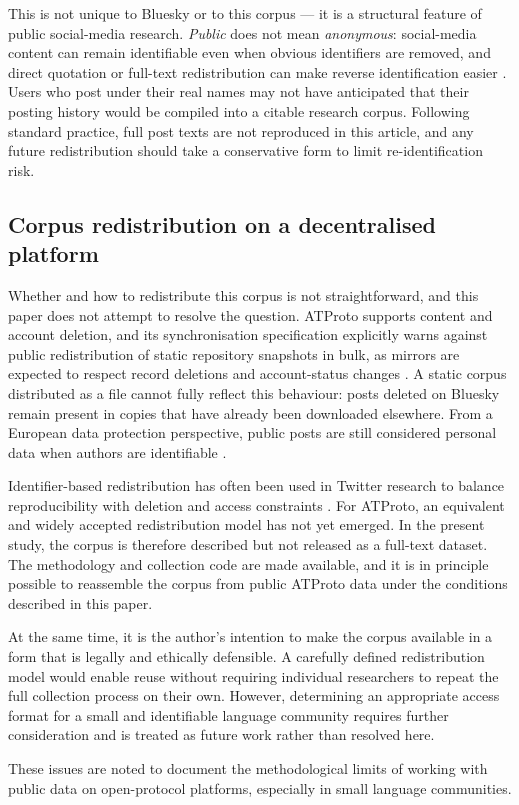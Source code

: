 This is not unique to Bluesky or to this corpus --- it is a structural feature of public social-media research. \textit{Public} does not mean \textit{anonymous}: social-media content can remain identifiable even when obvious identifiers are removed, and direct quotation or full-text redistribution can make reverse identification easier \parencite{aoir2019internet,ayers2018dont}. Users who post under their real names may not have anticipated that their posting history would be compiled into a citable research corpus. Following standard practice, full post texts are not reproduced in this article, and any future redistribution should take a conservative form to limit re-identification risk.

\subsection{Corpus redistribution on a decentralised platform}

Whether and how to redistribute this corpus is not straightforward, and this paper does not attempt to resolve the question. ATProto supports content and account deletion, and its synchronisation specification explicitly warns against public redistribution of static repository snapshots in bulk, as mirrors are expected to respect record deletions and account-status changes \parencite{atproto-sync}. A static corpus distributed as a file cannot fully reflect this behaviour: posts deleted on Bluesky remain present in copies that have already been downloaded elsewhere. From a European data protection perspective, public posts are still considered personal data when authors are identifiable \parencite{gdpr2016}.

Identifier-based redistribution has often been used in Twitter research to balance reproducibility with deletion and access constraints \parencite{kinderkurlanda2017archiving}. For ATProto, an equivalent and widely accepted redistribution model has not yet emerged. In the present study, the corpus is therefore described but not released as a full-text dataset. The methodology and collection code are made available, and it is in principle possible to reassemble the corpus from public ATProto data under the conditions described in this paper.

At the same time, it is the author’s intention to make the corpus available in a form that is legally and ethically defensible. A carefully defined redistribution model would enable reuse without requiring individual researchers to repeat the full collection process on their own. However, determining an appropriate access format for a small and identifiable language community requires further consideration and is treated as future work rather than resolved here.

These issues are noted to document the methodological limits of working with public data on open-protocol platforms, especially in small language communities.